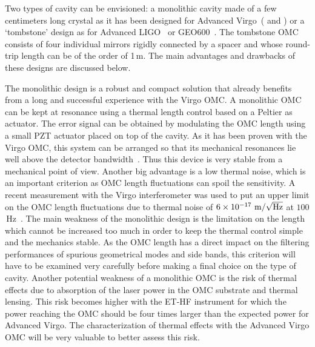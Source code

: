 Two types of cavity can be envisioned: a monolithic cavity made of a few centimeters long crystal as it has been designed for Advanced
 Virgo~(\cite{VIR-NOT-071A-08} and \cite{VIR-0020A-11}) or a `tombstone' design as for Advanced LIGO~\cite{LIGO-T1000276} or GEO600~\cite{Degallaix10, Prijatelj10}. The tombstone 
 OMC consists of four individual mirrors rigidly connected by a spacer and whose round-trip length can be of the order of 1\,m. The main
  advantages and drawbacks of these designs are discussed below.

The monolithic design is a robust and compact solution that already benefits from a long and successful experience with the Virgo OMC. 
A monolithic OMC can be kept at resonance using a thermal length control based on a Peltier as actuator. The error signal can be obtained by 
modulating the OMC length using a small PZT actuator placed on top of the cavity. As it has been proven with the Virgo OMC, this 
system can be arranged so that its mechanical resonances lie well above the detector bandwidth~\cite{Derome97}. Thus this device is 
very stable from a mechanical point of view. Another big advantage is a low thermal noise, which is an important criterion as OMC 
length fluctuations can spoil the sensitivity. A recent measurement with the Virgo interferometer was used to put an upper limit on the 
OMC length fluctuations due to thermal noise of $6 \times 10^{-17}~{\rm m}/\sqrt{\rm Hz}$ at $100$\,Hz~\cite{VIR-0020A-11}. 
 The main weakness of the monolithic design is the limitation on the length which cannot be increased too much in order to keep 
 the thermal control simple and the mechanics stable. As the OMC length has a direct impact on the filtering performances of spurious 
 geometrical modes and side bands, this criterion will have to be examined very carefully before making a final choice on the type of 
 cavity. Another potential weakness of a monolithic OMC is the risk of thermal effects due to absorption of the laser power in the OMC
  substrate and thermal lensing. This risk becomes higher with the ET-HF instrument for which the power reaching the OMC should be 
  four times larger than the expected power for Advanced Virgo. The characterization of thermal effects with the Advanced Virgo OMC
   will be very valuable to better assess this risk.

